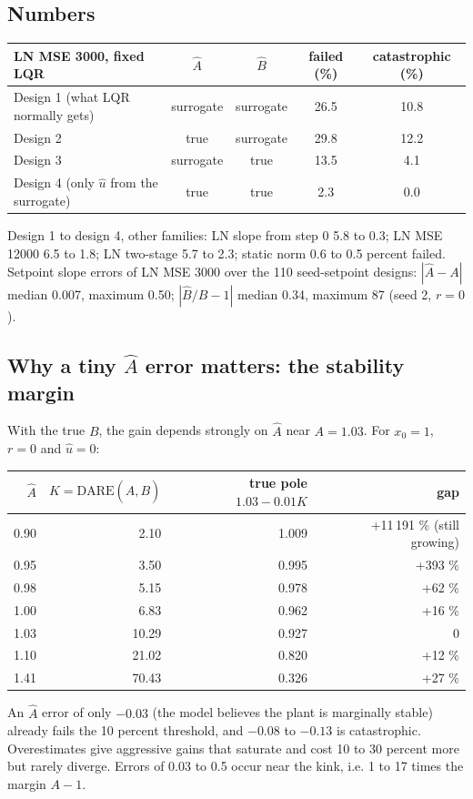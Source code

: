\documentclass[11pt]{article}
\begin{document}
\subsection{Numbers}
\begin{center}
\begin{tabular}{lcccc}
\toprule
LN MSE 3000, fixed LQR & $\hat A$ & $\hat B$ & failed (\%) & catastrophic (\%) \\
\midrule
Design 1 (what LQR normally gets) & surrogate & surrogate & 26.5 & 10.8 \\
Design 2 & true & surrogate & 29.8 & 12.2 \\
Design 3 & surrogate & true & 13.5 & 4.1 \\
Design 4 (only $\hat u$ from the surrogate) & true & true & 2.3 & 0.0 \\
\bottomrule
\end{tabular}
\end{center}
Design 1 to design 4, other families: LN slope from step 0 5.8 to 0.3; LN MSE 12000 6.5 to 1.8; LN two-stage 5.7 to 2.3; static norm 0.6 to 0.5 percent failed. Setpoint slope errors of LN MSE 3000 over the 110 seed-setpoint designs: $|\hat A-A|$ median 0.007, maximum 0.50; $|\hat B/B-1|$ median 0.34, maximum 87 (seed 2, $r=0$).

\subsection{Why a tiny $\hat A$ error matters: the stability margin}
With the true $B$, the gain depends strongly on $\hat A$ near $A=1.03$. For $x_0=1$, $r=0$ and $\hat u=0$:
\begin{center}
\begin{tabular}{rrrr}
\toprule
$\hat A$ & $K=\mathrm{DARE}(\hat A,B)$ & true pole $1.03-0.01K$ & gap \\
\midrule
0.90 & 2.10 & 1.009 & +11\,191 \% (still growing) \\
0.95 & 3.50 & 0.995 & +393 \% \\
0.98 & 5.15 & 0.978 & +62 \% \\
1.00 & 6.83 & 0.962 & +16 \% \\
1.03 & 10.29 & 0.927 & 0 \\
1.10 & 21.02 & 0.820 & +12 \% \\
1.41 & 70.43 & 0.326 & +27 \% \\
\bottomrule
\end{tabular}
\end{center}
An $\hat A$ error of only $-0.03$ (the model believes the plant is marginally stable) already fails the 10 percent threshold, and $-0.08$ to $-0.13$ is catastrophic. Overestimates give aggressive gains that saturate and cost 10 to 30 percent more but rarely diverge. Errors of 0.03 to 0.5 occur near the kink, i.e. 1 to 17 times the margin $A-1$.
\end{document}
